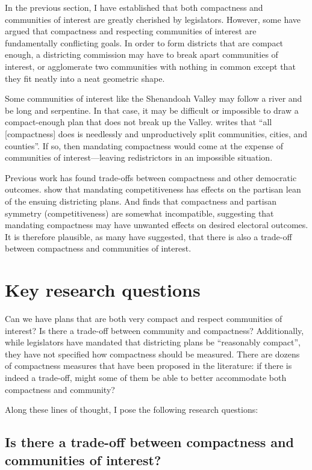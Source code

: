 \documentclass[]{article}
\begin{document}
In the previous section, I have established that both compactness and
communities of interest are greatly cherished by legislators. However,
some have argued that compactness and respecting communities of interest
are fundamentally conflicting goals. In order to form districts that are
compact enough, a districting commission may have to break apart
communities of interest, or agglomerate two communities with nothing in
common except that they fit neatly into a neat geometric shape.

Some communities of interest like the Shenandoah Valley may follow a
river and be long and serpentine. In that case, it may be difficult or
impossible to draw a compact-enough plan that does not break up the
Valley. \citeauthor{wolf2015} writes that ``all {[}compactness{]} does
is needlessly and unproductively split communities, cities, and
counties''. If so, then mandating compactness would come at the expense
of communities of interest---leaving redistrictors in an impossible
situation.

Previous work has found trade-offs between compactness and other
democratic outcomes. \cite{ddj2019comp} show that mandating
competitiveness has effects on the partisan lean of the ensuing
districting plans. And \cite{s2020} finds that compactness and partisan
symmetry (competitiveness) are somewhat incompatible, suggesting that
mandating compactness may have unwanted effects on desired electoral
outcomes. It is therefore plausible, as many have suggested, that there
is also a trade-off between compactness and communities of interest.

\hypertarget{key-research-questions}{%
\section{Key research questions}\label{key-research-questions}}

Can we have plans that are both very compact and respect communities of
interest? Is there a trade-off between community and compactness?
Additionally, while legislators have mandated that districting plans be
``reasonably compact'', they have not specified how compactness should
be measured. There are dozens of compactness measures that have been
proposed in the literature: if there is indeed a trade-off, might some
of them be able to better accommodate both compactness and community?

Along these lines of thought, I pose the following research questions:

\hypertarget{is-there-a-trade-off-between-compactness-and-communities-of-interest}{%
\subsection{Is there a trade-off between compactness and communities of
interest?}\label{is-there-a-trade-off-between-compactness-and-communities-of-interest}}
\end{document}
